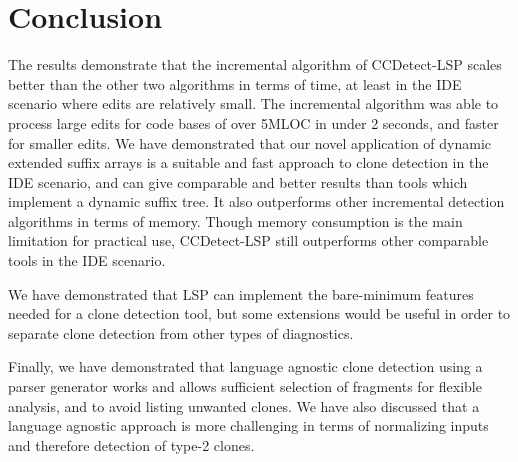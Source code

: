 \section{Conclusion}

The results demonstrate that the incremental algorithm of CCDetect-LSP scales better than
the other two algorithms in terms of time, at least in the IDE scenario where edits are
relatively small. The incremental algorithm was able to process large edits for code bases
of over 5MLOC in under 2 seconds, and faster for smaller edits. We have demonstrated that
our novel application of dynamic extended suffix arrays is a suitable and fast approach to
clone detection in the IDE scenario, and can give comparable and better results than tools
which implement a dynamic suffix tree. It also outperforms other incremental detection
algorithms in terms of memory. Though memory consumption is the main limitation for
practical use, CCDetect-LSP still outperforms other comparable tools in the IDE scenario.

We have demonstrated that LSP can implement the bare-minimum features needed for a clone
detection tool, but some extensions would be useful in order to separate clone detection
from other types of diagnostics.

Finally, we have demonstrated that language agnostic clone detection using a parser
generator works and allows sufficient selection of fragments for flexible analysis, and to
avoid listing unwanted clones. We have also discussed that a language agnostic approach is
more challenging in terms of normalizing inputs and therefore detection of type-2 clones.
